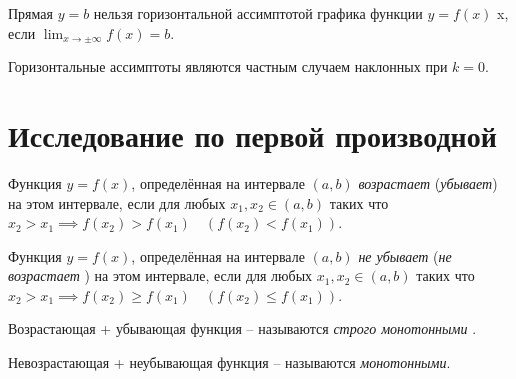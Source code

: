 \begin{definition}
  Прямая $y = b$ нельзя горизонтальной ассимптотой графика функции  $y = f(x)$ x, если $\lim_{x \to \pm\infty} f(x) = b$.
\end{definition}
\begin{corollary}
  Горизонтальные ассимптоты являются частным случаем наклонных при $k = 0$.
\end{corollary}

\section{Исследование по первой производной}

\begin{definition}
  Функция $y = f(x)$, определённая на интервале $(a, b)$ \textit{возрастает} (\textit{убывает}) на этом интервале, если для любых  $x_1, x_2 \in (a, b)$ таких что $x_2 > x_1 \implies f(x_2) > f(x_1) \quad (f(x_2) < f(x_1))$.
\end{definition}

\begin{definition}
  Функция $y = f(x)$, определённая на интервале $(a, b)$ \textit{не убывает} (\textit{не возрастает} ) на этом интервале, если для любых  $x_1, x_2 \in (a, b)$ таких что $x_2 > x_1 \implies f(x_2) \ge f(x_1) \quad (f(x_2) \le f(x_1))$.
\end{definition}

\begin{definition}
  Возрастающая + убывающая функция -- называются \textit{строго монотонными} .
\end{definition}

\begin{definition}
  Невозрастающая + неубывающая функция -- называются \textit{монотонными}.
\end{definition}

